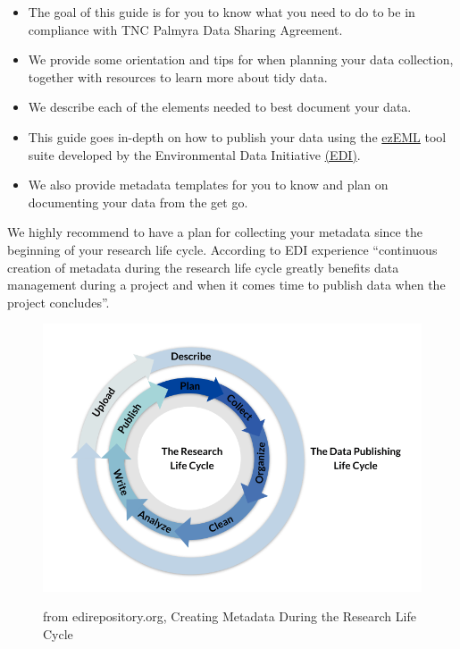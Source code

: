 \documentclass[
  letterpaper,
  DIV=11,
  numbers=noendperiod]{scrreprt}
\providecommand{\tightlist}{%
  \setlength{\itemsep}{0pt}\setlength{\parskip}{0pt}}\usepackage{longtable,booktabs,array}
\begin{document}
\begin{itemize}
\tightlist
\item
  The goal of this guide is for you to know what you need to do to be in
  compliance with TNC Palmyra Data Sharing Agreement.
\item
  We provide some orientation and tips for when planning your data
  collection, together with resources to learn more about tidy data.
\item
  We describe each of the elements needed to best document your data.
\item
  This guide goes in-depth on how to publish your data using the
  \href{https://ezeml.edirepository.org/eml/}{ezEML} tool suite
  developed by the Environmental Data Initiative
  \href{https://edirepository.org/}{(EDI)}.
\item
  We also provide metadata templates for you to know and plan on
  documenting your data from the get go.
\end{itemize}

\begin{tcolorbox}[enhanced jigsaw, colbacktitle=quarto-callout-color!10!white, title={Recommendation}, colframe=quarto-callout-color-frame, arc=.35mm, rightrule=.15mm, colback=white, toptitle=1mm, titlerule=0mm, toprule=.15mm, bottomtitle=1mm, bottomrule=.15mm, leftrule=.75mm, opacityback=0, breakable, coltitle=black, opacitybacktitle=0.6, left=2mm]
We highly recommend to have a plan for collecting your metadata since
the beginning of your research life cycle. According to EDI experience
``continuous creation of metadata during the research life cycle greatly
benefits data management during a project and when it comes time to
publish data when the project concludes''.
\end{tcolorbox}

\begin{figure}

{\centering 

\href{https://edirepository.org/resources/creating-metadata-during-the-research-lifecycle}{\includegraphics{content/pics/metadata-in-the-research-life-cycle.png}}

}

\caption{from edirepository.org, Creating Metadata During the Research
Life Cycle}

\end{figure}
\end{document}
